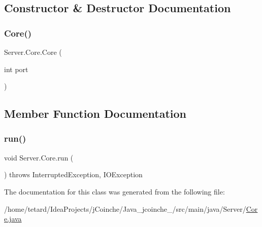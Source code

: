 \subsection{Constructor \& Destructor Documentation}
\mbox{\label{classServer_1_1Core_a84686707df17f13d058e714bfb4ea47c}} 
\subsubsection{\texorpdfstring{Core()}{Core()}}
{\footnotesize\ttfamily Server.\+Core.\+Core (\begin{DoxyParamCaption}\item[{int}]{port }\end{DoxyParamCaption})\hspace{0.3cm}{\ttfamily [inline]}}



\subsection{Member Function Documentation}
\mbox{\label{classServer_1_1Core_aee36e713f04f6094446647d47edf2765}} 
\subsubsection{\texorpdfstring{run()}{run()}}
{\footnotesize\ttfamily void Server.\+Core.\+run (\begin{DoxyParamCaption}{ }\end{DoxyParamCaption}) throws Interrupted\+Exception, I\+O\+Exception\hspace{0.3cm}{\ttfamily [inline]}}



The documentation for this class was generated from the following file\+:\begin{DoxyCompactItemize}
\item 
/home/tetard/\+Idea\+Projects/j\+Coinche/\+Java\+\_\+jcoinche\+\_/src/main/java/\+Server/\mbox{\hyperlink{Core_8java}{Core.\+java}}\end{DoxyCompactItemize}
